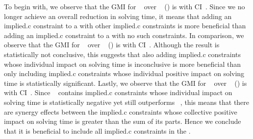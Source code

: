 To begin with, we observe that the \gls{GMI} for ~\modelD{} over ~\modelC{}
() is \printGMI{%
  \SolvTechEnableOnlyGoodImpliedConsPrePlusSolvingTimeSpeedupPrePlusSolvingTimeRegularSpeedupGmean%
} with \gls{CI}~\printGMICI{%
  \SolvTechEnableOnlyGoodImpliedConsPrePlusSolvingTimeSpeedupPrePlusSolvingTimeRegularSpeedupCiMin%
}{%
  \SolvTechEnableOnlyGoodImpliedConsPrePlusSolvingTimeSpeedupPrePlusSolvingTimeRegularSpeedupCiMax%
}.
%
Since we no longer achieve an overall reduction in solving time, it means that
adding an \gls{implied.c} \gls{constraint} to a  with
other \gls{implied.c} \glspl{constraint} is more beneficial than adding an
\gls{implied.c} \gls{constraint} to a  with no such
\glspl{constraint}.
%
In comparison, we observe that the \gls{GMI} for ~\modelE{} over ~\modelC{}
() is \printGMI{%
  \SolvTechDisableBadImpliedConsPrePlusSolvingTimeSpeedupPrePlusSolvingTimeRegularSpeedupGmean%
} with \gls{CI}~\printGMICI{%
  \SolvTechDisableBadImpliedConsPrePlusSolvingTimeSpeedupPrePlusSolvingTimeRegularSpeedupCiMin%
}{%
  \SolvTechDisableBadImpliedConsPrePlusSolvingTimeSpeedupPrePlusSolvingTimeRegularSpeedupCiMax%
}.
%
Although the result is statistically not conclusive, this suggests that also
adding \gls{implied.c} \glspl{constraint} whose individual impact on solving
time is inconclusive is more beneficial than only including \gls{implied.c}
\glspl{constraint} whose individual positive impact on solving time is
statistically significant.
%
Lastly, we observe that the \gls{GMI} for ~\modelF{}
over ~\modelC{}
() is \printGMI{%
  \SolvTechDisableAllImpliedConsPrePlusSolvingTimeSpeedupPrePlusSolvingTimeRegularSpeedupGmean%
} with \gls{CI}~\printGMICI{%
  \SolvTechDisableAllImpliedConsPrePlusSolvingTimeSpeedupPrePlusSolvingTimeRegularSpeedupCiMin%
}{%
  \SolvTechDisableAllImpliedConsPrePlusSolvingTimeSpeedupPrePlusSolvingTimeRegularSpeedupCiMax%
}.
%
Since ~\modelF{} contains \gls{implied.c}
\glspl{constraint} whose individual impact on solving time is statistically
negative yet still outperforms ~\modelE, this means
that there are synergy effects between the \gls{implied.c} \glspl{constraint}
whose collective positive impact on solving time is greater than the sum of its
parts.
%
Hence we conclude that it is beneficial to include all \gls{implied.c}
\glspl{constraint} in the .


